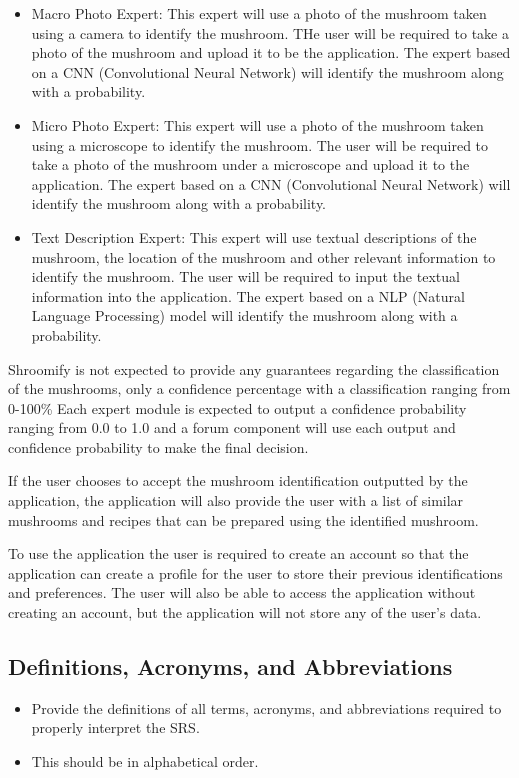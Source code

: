 \documentclass[]{article}
\begin{document}
\begin{itemize}
	\item Macro Photo Expert: This expert will use a photo of the mushroom taken using a camera to identify the mushroom. THe user will be required to take a photo of the mushroom and upload it to be the application. The expert based on a CNN (Convolutional Neural Network) will identify the mushroom along with a probability.
	\item Micro Photo Expert: This expert will use a photo of the mushroom taken using a microscope to identify the mushroom. The user will be required to take a photo of the mushroom under a microscope and upload it to the application. The expert based on a CNN (Convolutional Neural Network) will identify the mushroom along with a probability.
	\item Text Description Expert: This expert will use textual descriptions of the mushroom, the location of the mushroom and other relevant information to identify the mushroom. The user will be required to input the textual information into the application. The expert based on a NLP (Natural Language Processing) model will identify the mushroom along with a probability.
\end{itemize}

Shroomify is not expected to provide any guarantees regarding the classification of the mushrooms, only a confidence percentage with a classification ranging from 0-100\%
Each expert module is expected to output a confidence probability ranging from 0.0 to 1.0 and a forum component will use each output and confidence probability to make the final decision.

If the user chooses to accept the mushroom identification outputted by the application, the application will also provide the user with a list of similar mushrooms and recipes that can be prepared using the identified mushroom.

To use the application the user is required to create an account so that the application can create a profile for the user to store their previous identifications and preferences. The user will also be able to access the application without creating an account, but the application will not store any of the user's data.

\subsection{Definitions, Acronyms, and Abbreviations}
\label{sub:definitions_acronyms_and_abbreviations}
\begin{itemize}
	\item Provide the definitions of all terms, acronyms, and abbreviations required to properly interpret the SRS.
	\item This should be in alphabetical order.
\end{itemize}
\end{document}
